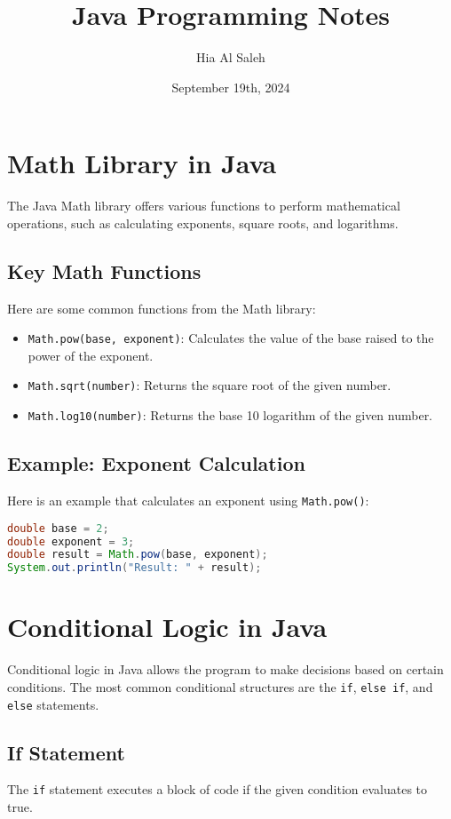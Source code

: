 \documentclass{article}
\title{Java Programming Notes}
\author{Hia Al Saleh}
\date{September 19th, 2024}
\begin{document}
\maketitle
\tableofcontents
\newpage

\section{Math Library in Java}
The Java Math library offers various functions to perform mathematical operations, such as calculating exponents, square roots, and logarithms.

\subsection{Key Math Functions}
Here are some common functions from the Math library:
\begin{itemize}
    \item \texttt{Math.pow(base, exponent)}: Calculates the value of the base raised to the power of the exponent.
    \item \texttt{Math.sqrt(number)}: Returns the square root of the given number.
    \item \texttt{Math.log10(number)}: Returns the base 10 logarithm of the given number.
\end{itemize}

\subsection{Example: Exponent Calculation}
Here is an example that calculates an exponent using \texttt{Math.pow()}:
\begin{lstlisting}[language=Java]
double base = 2;
double exponent = 3;
double result = Math.pow(base, exponent);
System.out.println("Result: " + result);
\end{lstlisting}

\section{Conditional Logic in Java}
Conditional logic in Java allows the program to make decisions based on certain conditions. The most common conditional structures are the \texttt{if}, \texttt{else if}, and \texttt{else} statements.

\subsection{If Statement}
The \texttt{if} statement executes a block of code if the given condition evaluates to true.
\end{document}
